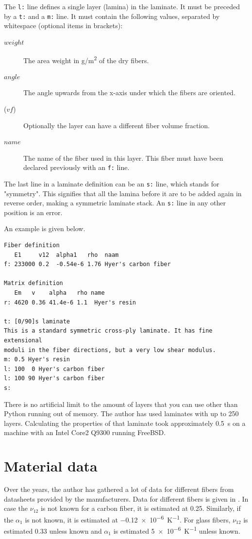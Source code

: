 \documentclass[a4paper,landscape,oneside,11pt,twocolumn]{memoir}
\begin{document}
The \texttt{l:} line defines a single layer (lamina) in the laminate. It must be
preceded by a \texttt{t:} and a \texttt{m:} line. It must contain the following values,
separated by whitespace (optional items in brackets):
\begin{description}
    \item[$weight$] The area weight in \si{g/m^2} of the dry fibers.
    \item[$angle$] The angle upwards from the x-axis under which the fibers are oriented.
    \item[($vf$)] Optionally the layer can have a different fiber volume fraction.
    \item[$name$] The name of the fiber used in this layer. This fiber must have been
        declared previously with an \texttt{f:} line.
\end{description}

The last line in a laminate definition can be an \texttt{s:} line, which stands
for "symmetry". This signifies that all the lamina before it are to be added
again in reverse order, making a symmetric laminate stack. An \texttt{s:} line in any
other position is an error.

An example is given below.

\begin{lstlisting}[style=plain]
Fiber definition
   E1     v12  alpha1   rho  naam
f: 233000 0.2  -0.54e-6 1.76 Hyer's carbon fiber

Matrix definition
   Em   v    alpha   rho name
r: 4620 0.36 41.4e-6 1.1  Hyer's resin

t: [0/90]s laminate
This is a standard symmetric cross-ply laminate. It has fine extensional
moduli in the fiber directions, but a very low shear modulus.
m: 0.5 Hyer's resin
l: 100  0 Hyer's carbon fiber
l: 100 90 Hyer's carbon fiber
s:
\end{lstlisting}

There is no artificial limit to the amount of layers that you can use other
than Python running out of memory. The author has used laminates with up to
250 layers. Calculating the properties of that laminate took approximately
\SI{0.5}{s} on a machine with an Intel Core2 Q9300 running FreeBSD.

\section{Material data} %

Over the years, the author has gathered a lot of data for different fibers
from datasheets provided by the manufacturers. Data for different
fibers is given in . In case the $\nu_{12}$ is not
known for a carbon fiber, it is estimated at 0.25. Similarly, if the
$\alpha_1$ is not known, it is estimated at \SI{-0.12e-6}{K^{-1}}. For glass
fibers, $\nu_{12}$ is estimated 0.33 unless known and $\alpha_1$ is estimated
\SI{5e-6}{K^{-1}} unless known.
\end{document}
